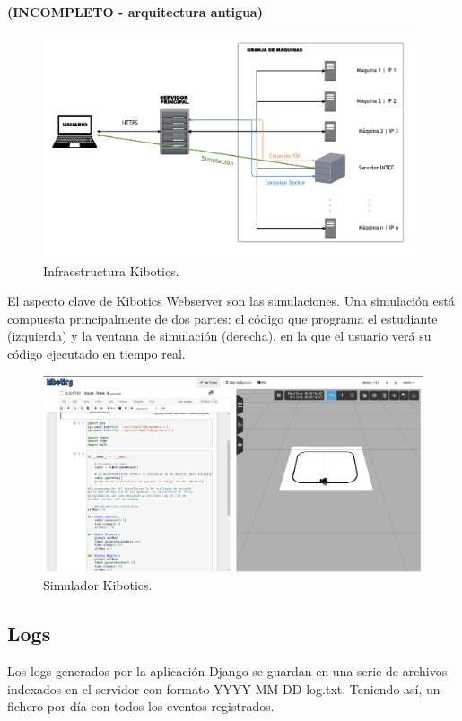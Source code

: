 \documentclass[11pt,a4paper]{book}
\begin{document}
				\textbf{(INCOMPLETO - arquitectura antigua)}
				\begin{figure}[H]
					\centering
					\includegraphics[width=11cm, keepaspectratio]{img/kibotics-infraestructura.png}
					\caption{Infraestructura Kibotics.}
					\label{fig:infraestructura_kibotics}
				\end{figure}
				El aspecto clave de Kibotics Webserver son las simulaciones. Una simulación está compuesta principalmente de dos partes: el código que programa el estudiante (izquierda) y la ventana de simulación (derecha), en la que el usuario verá su código ejecutado en tiempo real.

				\begin{figure}[H]
					\centering
					\includegraphics[width=15cm, keepaspectratio]{img/simulacion_kibotics.png}
					\caption{Simulador Kibotics.}
					\label{fig:simulacion_kibotics}
				\end{figure}

			\subsection{Logs}
			Los logs generados por la aplicación Django se guardan en una serie de archivos indexados en el servidor con formato YYYY-MM-DD-log.txt. Teniendo así, un fichero por día con todos los eventos registrados.\\
						
\end{document}
